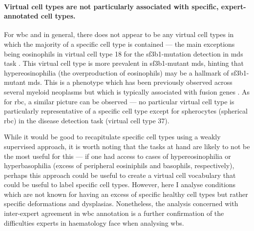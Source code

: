 \paragraph{Virtual cell types are not particularly associated with specific, expert-annotated cell types.} For \ac{wbc} and in general, there does not appear to be any virtual cell types in which the majority of a specific cell type is contained --- the main exceptions being eosinophils in virtual cell type 18 for the \ac{sf3b1}-mutation detection in \ac{mds} task . This virtual cell type is more prevalent in \ac{sf3b1}-mutant \ac{mds}, hinting that hypereosinophilia (the overproduction of eosinophils) may be a hallmark of \ac{sf3b1}-mutant \ac{mds}. This is a phenotype which has been previously observed across several myeloid neoplasms but which is typically associated with fusion genes \cite{Reiter2017-pj}. As for \ac{rbc}, a similar picture can be observed --- no particular virtual cell type is particularly representative of a specific cell type except for spherocytes (spherical \ac{rbc}) in the disease detection task (virtual cell type 37). 

\begin{figure}[!ht]
    \label{fig:mile-vice-annotated-cells-wbc}
\end{figure}

\begin{figure}[!ht]
    \label{fig:mile-vice-annotated-cells-rbc}
\end{figure}

While it would be good to recapitulate specific cell types using a weakly supervised approach, it is worth noting that the tasks at hand are likely to not be the most useful for this --- if one had access to cases of hypereosinophilia or hyperbasophilia (excess of peripheral eosiniphils and basophils, respectively), perhaps this approach could be useful to create a virtual cell vocabulary that could be useful to label specific cell types. However, here I analyse conditions which are not known for having an excess of specific healthy cell types but rather specific deformations and dysplasias. Nonetheless, the analysis concerned with inter-expert agreement in \ac{wbc} annotation is a further confirmation of the difficulties experts in haematology face when analysing \ac{wbs}.

